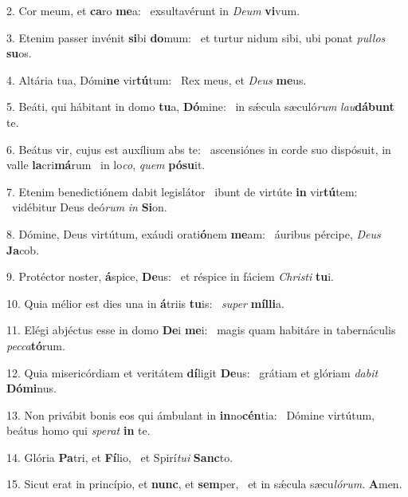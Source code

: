 2. Cor meum, et \textbf{ca}ro \textbf{me}a: \ast\  exsultavérunt in \textit{De}\textit{um} \textbf{vi}vum.\

3. Etenim passer invénit \textbf{si}bi \textbf{do}mum: \ast\  et turtur nidum sibi, ubi ponat \textit{pul}\textit{los} \textbf{su}os.\

4. Altária tua, Dómi\textbf{ne} vir\textbf{tú}tum: \ast\  Rex meus, et \textit{De}\textit{us} \textbf{me}us.\

5. Beáti, qui hábitant in domo \textbf{tu}a, \textbf{Dó}mine: \ast\  in sǽcula sæculó\textit{rum} \textit{lau}\textbf{dá}\textbf{bunt} te.\

6. Beátus vir, cujus est auxílium abs te: \dag\  ascensiónes in corde suo dispósuit, in valle \textbf{la}cri\textbf{má}rum \ast\  in lo\textit{co}, \textit{quem} \textbf{pó}\textbf{su}it.\

7. Etenim benedictiónem dabit legislátor \dag\  ibunt de virtúte \textbf{in} vir\textbf{tú}tem: \ast\  vidébitur Deus deó\textit{rum} \textit{in} \textbf{Si}on.\

8. Dómine, Deus virtútum, exáudi orati\textbf{ó}nem \textbf{me}am: \ast\  áuribus pércipe, \textit{De}\textit{us} \textbf{Ja}cob.\

9. Protéctor noster, \textbf{á}spice, \textbf{De}us: \ast\  et réspice in fáciem \textit{Chris}\textit{ti} \textbf{tu}i.\

10. Quia mélior est dies una in \textbf{á}triis \textbf{tu}is: \ast\  \textit{su}\textit{per} \textbf{míl}\textbf{li}a.\

11. Elégi abjéctus esse in domo \textbf{De}i \textbf{me}i: \ast\  magis quam habitáre in tabernáculis \textit{pec}\textit{ca}\textbf{tó}rum.\

12. Quia misericórdiam et veritátem \textbf{dí}ligit \textbf{De}us: \ast\  grátiam et glóriam \textit{da}\textit{bit} \textbf{Dó}\textbf{mi}nus.\

13. Non privábit bonis eos qui ámbulant in \textbf{in}no\textbf{cén}tia: \ast\  Dómine virtútum, beátus homo qui \textit{spe}\textit{rat} \textbf{in} te.\

14. Glória \textbf{Pa}tri, et \textbf{Fí}lio, \ast\  et Spirí\textit{tu}\textit{i} \textbf{Sanc}to.\

15. Sicut erat in princípio, et \textbf{nunc}, et \textbf{sem}per, \ast\  et in sǽcula sæcu\textit{ló}\textit{rum}. \textbf{A}men.\

